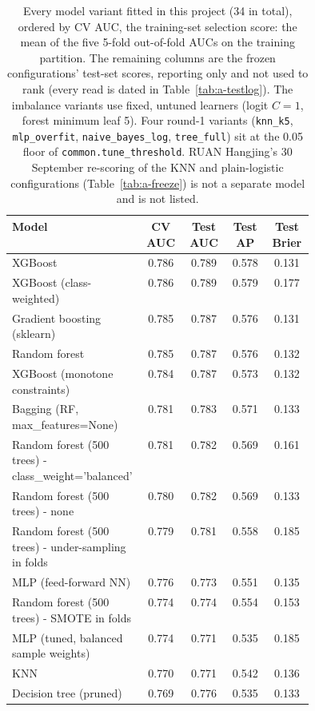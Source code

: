 \begin{table}[!htbp]
  \caption{Every model variant fitted in this project (34 in total), ordered by CV AUC, the training-set selection score: the mean of the five 5-fold out-of-fold AUCs on the training partition. The remaining columns are the frozen configurations' test-set scores, reporting only and not used to rank (every read is dated in Table~\ref{tab:a-testlog}). The imbalance variants use fixed, untuned learners (logit $C = 1$, forest minimum leaf 5). Four round-1 variants (\texttt{knn\_\allowbreak{}k5}, \texttt{mlp\_\allowbreak{}overfit}, \texttt{naive\_\allowbreak{}bayes\_\allowbreak{}log}, \texttt{tree\_\allowbreak{}full}) sit at the 0.05 floor of \texttt{common.tune\_threshold}. RUAN Hangjing's 30 September re-scoring of the KNN and plain-logistic configurations (Table~\ref{tab:a-freeze}) is not a separate model and is not listed.}
  \label{tab:a-allmodels}
  \centering
  \small
  \begin{tabular}{@{}L{0.44\linewidth}cccc@{}}
    \toprule
    Model & CV AUC & Test AUC & Test AP & Test Brier \\
    \midrule
    XGBoost & 0.786 & 0.789 & 0.578 & 0.131 \\
    XGBoost (class-weighted) & 0.786 & 0.789 & 0.579 & 0.177 \\
    Gradient boosting (sklearn) & 0.785 & 0.787 & 0.576 & 0.131 \\
    Random forest & 0.785 & 0.787 & 0.576 & 0.132 \\
    XGBoost (monotone constraints) & 0.784 & 0.787 & 0.573 & 0.132 \\
    Bagging (RF, max\_features=None) & 0.781 & 0.783 & 0.571 & 0.133 \\
    Random forest (500 trees) - class\_weight='balanced' & 0.781 & 0.782 & 0.569 & 0.161 \\
    Random forest (500 trees) - none & 0.780 & 0.782 & 0.569 & 0.133 \\
    Random forest (500 trees) - under-sampling in folds & 0.779 & 0.781 & 0.558 & 0.185 \\
    MLP (feed-forward NN) & 0.776 & 0.773 & 0.551 & 0.135 \\
    Random forest (500 trees) - SMOTE in folds & 0.774 & 0.774 & 0.554 & 0.153 \\
    MLP (tuned, balanced sample weights) & 0.774 & 0.771 & 0.535 & 0.185 \\
    KNN & 0.770 & 0.771 & 0.542 & 0.136 \\
    Decision tree (pruned) & 0.769 & 0.776 & 0.535 & 0.133 \\

\end{tabular}
\end{table}
